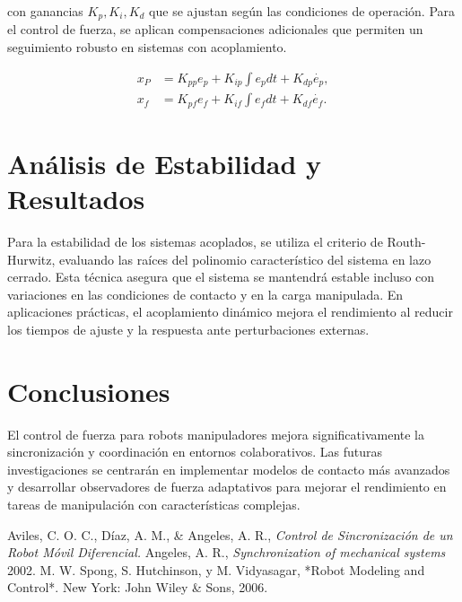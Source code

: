 \documentclass[conference]{IEEEtran}
\begin{document}
con ganancias \( K_{p}, K_{i}, K_{d} \) que se ajustan según las condiciones de operación. Para el control de fuerza, se aplican compensaciones adicionales que permiten un seguimiento robusto en sistemas con acoplamiento.

\begin{align}
	x_{P} & = K_{p p} e_{p} + K_{i p} \int e_{p} dt + K_{d p} \dot{e_{p}}, \\
	x_{f} & = K_{p f} e_{f} + K_{i f} \int e_{f} dt + K_{d f} \dot{e_{f}}.
\end{align}

\section*{Análisis de Estabilidad y Resultados}
Para la estabilidad de los sistemas acoplados, se utiliza el criterio de Routh-Hurwitz, evaluando las raíces del polinomio característico del sistema en lazo cerrado. Esta técnica asegura que el sistema se mantendrá estable incluso con variaciones en las condiciones de contacto y en la carga manipulada. En aplicaciones prácticas, el acoplamiento dinámico mejora el rendimiento al reducir los tiempos de ajuste y la respuesta ante perturbaciones externas.


\section*{Conclusiones}
El control de fuerza para robots manipuladores mejora significativamente la sincronización y coordinación en entornos colaborativos. Las futuras investigaciones se centrarán en implementar modelos de contacto más avanzados y desarrollar observadores de fuerza adaptativos para mejorar el rendimiento en tareas de manipulación con características complejas.

\begin{thebibliography}{9}
	 Aviles, C. O. C., Díaz, A. M., \& Angeles, A. R., \textit{Control de Sincronización de un Robot Móvil Diferencial.}
	 Angeles, A. R., \textit{Synchronization of mechanical systems} 2002.
	 M. W. Spong, S. Hutchinson, y M. Vidyasagar, *Robot Modeling and Control*. New York: John Wiley \& Sons, 2006.
\end{thebibliography}
\end{document}
